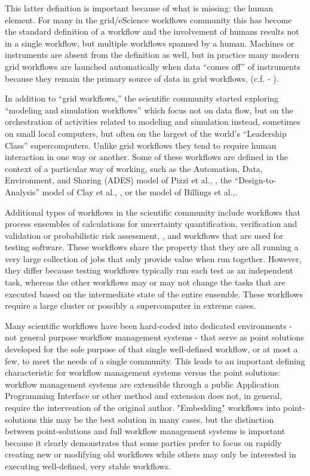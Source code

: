 This latter definition is important because of what is missing: the human
element. For many in the grid/eScience workflows community this has become
the standard definition of a workflow and the involvement of humans
results not in a single workflow, but multiple workflows spanned by a human.
Machines or instruments are absent from the definition as well, but in
practice many modern grid workflows are launched automatically
when data ``comes off'' of instruments because they remain the primary
source of data in grid workflows, (c.f. - \cite{megino_panda:_2015}).

In addition to ``grid workflows,'' the scientific community started
exploring ``modeling and simulation workflows'' which focus not on data
flow, but on the orchestration of activities related to modeling and
simulation instead, sometimes on small local computers, but often on the
largest of the world's ``Leadership Class'' supercomputers. Unlike grid
workflows they tend to require human interaction in one way or another.
Some of these workflows are defined in the context of a particular way
of working, such as the Automation, Data, Environment, and Sharing
(ADES) model of Pizzi et al., \cite{pizzi_aiida:_2016}, the
``Design-to-Analysis'' model of Clay et al., \cite{clay_incorporating_2015}, or
the model of Billings et al.,\cite{billings_eclipse_2017}.

Additional types of workflows in the scientific community include
workflows that process ensembles of calculations for uncertainty quantification, verification and validation or probabilistic risk assessment, \cite{montoya_apex_2016},
and workflows that are used for testing software. These workflows share the property that they are all running a very large collection of jobs that only provide value when run together. However, they differ because testing workflows typically run each test as an independent task, whereas the other workflows may or may not change the tasks that are executed based on the intermediate state of the entire ensemble. These workflows require a large cluster or possibly a supercomputer in extreme cases.

Many scientific workflows have been hard-coded into dedicated environments - not general purpose workflow management systems - that serve as point solutions developed for the sole purpose of that single well-defined workflow, or at most a few, to meet the needs of a single community. This leads to an important defining characteristic for workflow management systems versus the point solutions: workflow management systems are extensible through a public Application Programming Interface or other method and extension does not, in general, require the intervention of the original author. "Embedding" workflows into point-solutions this may be the best solution in many cases, but the distinction between point-solutions and full workflow management systems is important because it clearly demonstrates  that some parties prefer to focus on rapidly creating new or modifying old workflows while others may only be interested in executing well-defined, very stable workflows.

